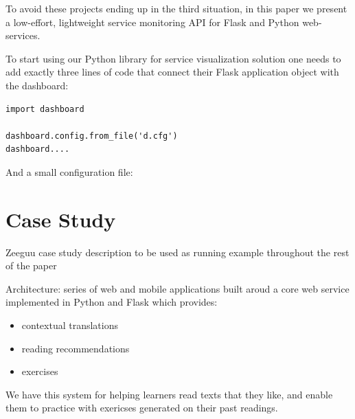 \documentclass[conference]{IEEEtran}
\begin{document}
To avoid these projects ending up in the third situation, in this paper we present a low-effort, lightweight service monitoring API for Flask and Python web-services.

To start using our Python library for service visualization solution one needs to add exactly three lines of code that connect their Flask application object with the dashboard:

\begin{lstlisting}[float,caption=TBA,style=custompython]
import dashboard

dashboard.config.from_file('d.cfg')
dashboard....

\end{lstlisting}


And a small configuration file: 





\section{Case Study}

Zeeguu case study description to be used as running example throughout the rest of the paper \cite{Lungu16}

Architecture: series of web and mobile applications built aroud a core web service implemented in Python and Flask which provides: 
\begin{itemize}
  \item contextual translations 
  \item reading recommendations
  \item exercises
\end{itemize}

We have this system for helping learners read texts that they like, and enable them to practice with exericses generated on their past readings.
\end{document}
